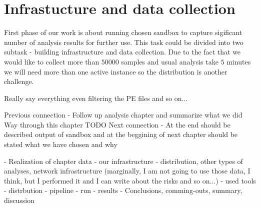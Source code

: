 \chapter{Infrastucture and data collection}
First phase of our work is about running chosen sandbox to capture sigificant number of analysis results for further use. This task could be divided into two subtask - building infrastructure and data collection. Due to the fact that we would like to collect more than $50 000$ samples and usual analysis take $5$ minutes we will need more than one active instance so the distribution is another challenge.


Really say everything even filtering the PE files and so on...


Previous connection
- Follow up analysis chapter and summarize what we did
Way through this chapter
TODO
Next connection
- At the end should be described output of sandbox and at the beggining of next chapter should be stated what we have chosen and why



- Realization of chapter data 
- our infrastructure - distribution, other types of analyses, network infrastructure (marginally, I am not going to use those data, I think, but I performed it and I can write about the risks and so on...)
- used tools
- distrbution
- pipeline
- run
- results
- Conclusions, comming-outs, summary, discussion